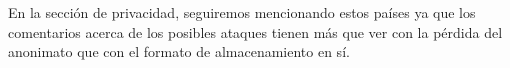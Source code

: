 En la sección de privacidad, seguiremos mencionando estos países ya que los comentarios acerca de los posibles ataques tienen más que ver con la pérdida del anonimato que con el formato de almacenamiento en sí.
















